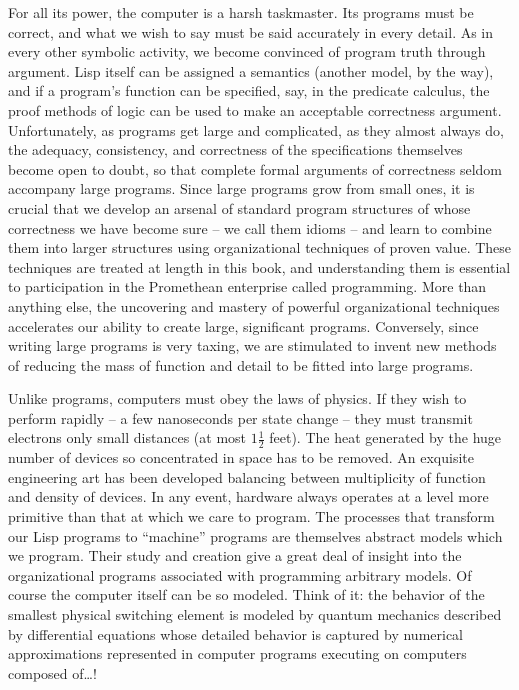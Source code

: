 For all its power, the computer is a harsh taskmaster.  Its programs
must be correct, and what we wish to say must be said accurately in
every detail.  As in every other symbolic activity, we become
convinced of program truth through argument.  Lisp itself can be
assigned a semantics (another model, by the way), and if a program's
function can be specified, say, in the predicate calculus, the proof
methods of logic can be used to make an acceptable correctness
argument.  Unfortunately, as programs get large and complicated, as
they almost always do, the adequacy, consistency, and correctness of
the specifications themselves become open to doubt, so that complete
formal arguments of correctness seldom accompany large programs.
Since large programs grow from small ones, it is crucial that we
develop an arsenal of standard program structures of whose correctness
we have become sure -- we call them idioms -- and learn to combine them
into larger structures using organizational techniques of proven
value.  These techniques are treated at length in this book, and
understanding them is essential to participation in the Promethean
enterprise called programming.  More than anything else, the
uncovering and mastery of powerful organizational techniques
accelerates our ability to create large, significant programs.
Conversely, since writing large programs is very taxing, we are
stimulated to invent new methods of reducing the mass of function and
detail to be fitted into large programs.

Unlike programs, computers must obey the laws of physics.  If they
wish to perform rapidly -- a few nanoseconds per state change -- they
must transmit electrons only small distances (at most $1\frac{1}{2}$
feet).  The heat generated by the huge number of devices so
concentrated in space has to be removed.  An exquisite engineering art
has been developed balancing between multiplicity of function and
density of devices.  In any event, hardware always operates at a level
more primitive than that at which we care to program.  The processes
that transform our Lisp programs to ``machine'' programs are
themselves abstract models which we program.  Their study and creation
give a great deal of insight into the organizational programs
associated with programming arbitrary models.  Of course the computer
itself can be so modeled.  Think of it: the behavior of the smallest
physical switching element is modeled by quantum mechanics described
by differential equations whose detailed behavior is captured by
numerical approximations represented in computer programs executing on
computers composed of\ldots{}!

